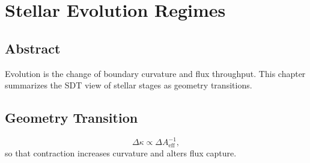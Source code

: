 \documentclass[12pt]{book}
\begin{document}
\chapter{Stellar Evolution Regimes}

\section*{Abstract}
Evolution is the change of boundary curvature and flux throughput. This chapter summarizes the SDT
view of stellar stages as geometry transitions.

\section{Geometry Transition}
\begin{equation}
\Delta \kappa \propto \Delta A_{\text{eff}}^{-1},
\end{equation}
so that contraction increases curvature and alters flux capture.
\end{document}

